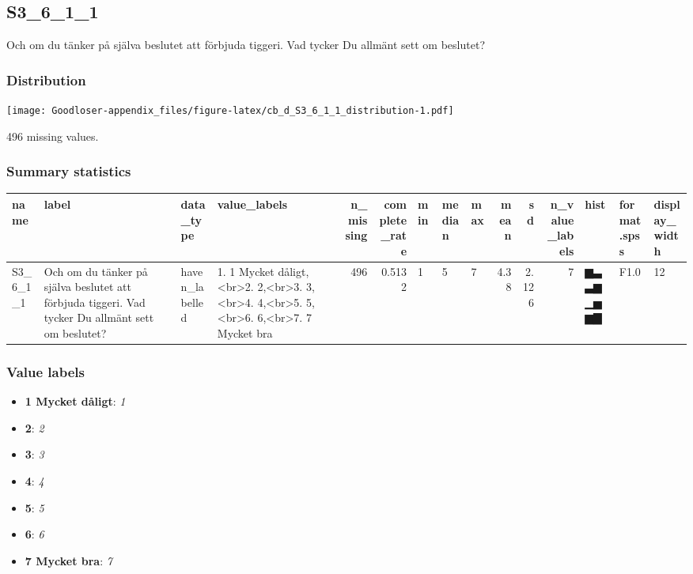 \documentclass[
]{book}
\providecommand{\tightlist}{%
  \setlength{\itemsep}{0pt}\setlength{\parskip}{0pt}}
\begin{document}
\hypertarget{S3_6_1_1}{%
\subsection{S3\_6\_1\_1}\label{S3_6_1_1}}

Och om du tänker på själva beslutet att förbjuda tiggeri. Vad tycker Du allmänt sett om beslutet?

\hypertarget{S3_6_1_1_distribution}{%
\subsubsection{Distribution}\label{S3_6_1_1_distribution}}

\texttt{[image: Goodloser-appendix\_files/figure-latex/cb\_d\_S3\_6\_1\_1\_distribution-1.pdf]}

496 missing values.

\hypertarget{S3_6_1_1_summary}{%
\subsubsection{Summary statistics}\label{S3_6_1_1_summary}}

\begin{tabular}{l|l|l|l|r|r|l|l|l|r|r|r|l|l|l}
\hline
name & label & data_type & value_labels & n_missing & complete_rate & min & median & max & mean & sd & n_value_labels & hist & format.spss & display_width\\
\hline
S3_6_1_1 & Och om du tänker på själva beslutet att förbjuda tiggeri. Vad tycker Du allmänt sett om beslutet? & haven_labelled & 1. 1 Mycket dåligt,<br>2. 2,<br>3. 3,<br>4. 4,<br>5. 5,<br>6. 6,<br>7. 7 Mycket bra & 496 & 0.5132 & 1 & 5 & 7 & 4.38 & 2.126 & 7 & ▆▃▃▆▁▅▆▇ & F1.0 & 12\\
\hline
\end{tabular}

\hypertarget{S3_6_1_1_labels}{%
\subsubsection{Value labels}\label{S3_6_1_1_labels}}

\begin{itemize}
\tightlist
\item
  \textbf{1 Mycket dåligt}: \emph{1}
\item
  \textbf{2}: \emph{2}
\item
  \textbf{3}: \emph{3}
\item
  \textbf{4}: \emph{4}
\item
  \textbf{5}: \emph{5}
\item
  \textbf{6}: \emph{6}
\item
  \textbf{7 Mycket bra}: \emph{7}
\end{itemize}
\end{document}
